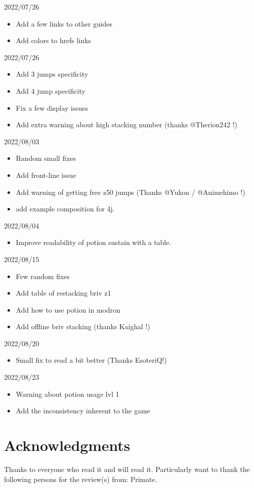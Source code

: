\documentclass{article}
\begin{document}
2022/07/26
\begin{itemize}
    \item Add a few links to other guides
    \item Add colors to hrefs links
\end{itemize}

2022/07/26
\begin{itemize}
    \item Add 3 jumps specificity
    \item Add 4 jump specificity
    \item Fix a few display issues 
    \item Add extra warning about high stacking number (thanks @Therion242 !)
\end{itemize}

2022/08/03
\begin{itemize}
    \item Random small fixes
    \item Add \hewmaan front-line issue
    \item Add warning of getting free z50 jumps (Thanks @Yukon / @Animehimo !)
    \item add example composition for 4j.
\end{itemize}

2022/08/04
\begin{itemize}
    \item Improve readability of potion sustain with a table.
\end{itemize}

2022/08/15
\begin{itemize}
    \item Few random fixes
    \item Add table of restacking briv z1
    \item Add how to use potion in modron
    \item Add offline briv stacking (thanks Kaighal !)
\end{itemize}

2022/08/20
\begin{itemize}
    \item Small fix to read a bit better (Thanks EsoteriQ!)
\end{itemize}

2022/08/23
\begin{itemize}
    \item Warning about potion usage lvl 1
    \item Add the inconsistency inherent to the game
\end{itemize}
    
    
\section{Acknowledgments}

Thanks to everyone who read it and will read it.
Particularly want to thank the following persons for the review(s) from: Primate.
\end{document}
